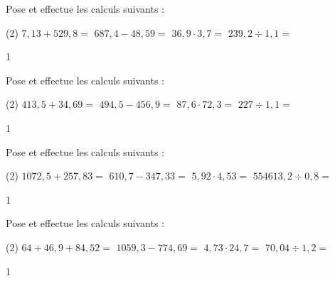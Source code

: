 \documentclass[a4paper,11pt]{report}
\begin{document}
\begin{exo}{
Pose et effectue les calculs suivants :
\begin{tasks}[after-item-skip = 0.4em, after-skip=-0.5em](2)
\task $7,13+529,8 =$
\task $687,4-48,59=$
\task $36,9\cdot 3,7 =$
\task $239,2 \div 1,1 =$
\end{tasks}
}{1}\end{exo}

\begin{exo}{
Pose et effectue les calculs suivants :
\begin{tasks}[after-item-skip = 0.4em, after-skip=-0.5em](2)
\task $413,5+34,69 =$
\task $494,5-456,9=$
\task $87,6\cdot 72,3 =$
\task $227 \div 1,1 =$
\end{tasks}
}{1}\end{exo}

\begin{exo}{
Pose et effectue les calculs suivants :
\begin{tasks}[after-item-skip = 0.4em, after-skip=-0.5em](2)
\task $1072,5+257,83 =$
\task $610,7-347,33=$
\task $5,92\cdot 4,53 =$
\task $554613,2  \div 0,8 =$
\end{tasks}
}{1}\end{exo}

\begin{exo}{
Pose et effectue les calculs suivants :
\begin{tasks}[after-item-skip = 0.4em, after-skip=-0.5em](2)
\task $64+46,9+84,52 =$
\task $1059,3-774,69=$
\task $4,73\cdot 24,7 =$
\task $70,04 \div 1,2 =$
\end{tasks}
}{1}\end{exo}




\vfill


\vfill


\vfill


\vfill


\end{document}
